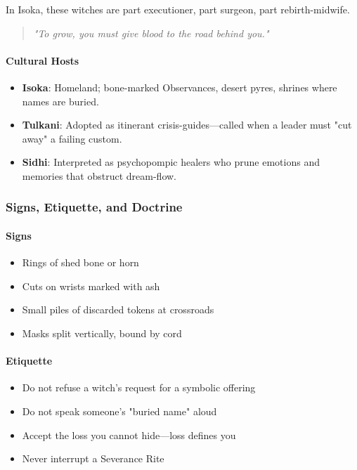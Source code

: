 \documentclass[11pt]{book}
\begin{document}
In Isoka, these witches are part executioner, part surgeon, part rebirth-midwife.

\begin{quote}
    \emph{"To grow, you must give blood to the road behind you."}
\end{quote}

\paragraph{Cultural Hosts}
\begin{itemize}[leftmargin=*]
    \item \textbf{Isoka}: Homeland; bone-marked Observances, desert pyres, shrines where names are buried.  
    \item \textbf{Tulkani}: Adopted as itinerant crisis-guides---called when a leader must "cut away" a failing custom.  
    \item \textbf{Sidhi}: Interpreted as psychopompic healers who prune emotions and memories that obstruct dream-flow.
\end{itemize}

\subsubsection{Signs, Etiquette, and Doctrine}

\paragraph{Signs}
\begin{itemize}[leftmargin=*]
    \item Rings of shed bone or horn  
    \item Cuts on wrists marked with ash  
    \item Small piles of discarded tokens at crossroads  
    \item Masks split vertically, bound by cord  
\end{itemize}

\paragraph{Etiquette}
\begin{itemize}[leftmargin=*]
    \item Do not refuse a witch's request for a symbolic offering  
    \item Do not speak someone's "buried name" aloud  
    \item Accept the loss you cannot hide---loss defines you  
    \item Never interrupt a Severance Rite  
\end{itemize}
\end{document}
